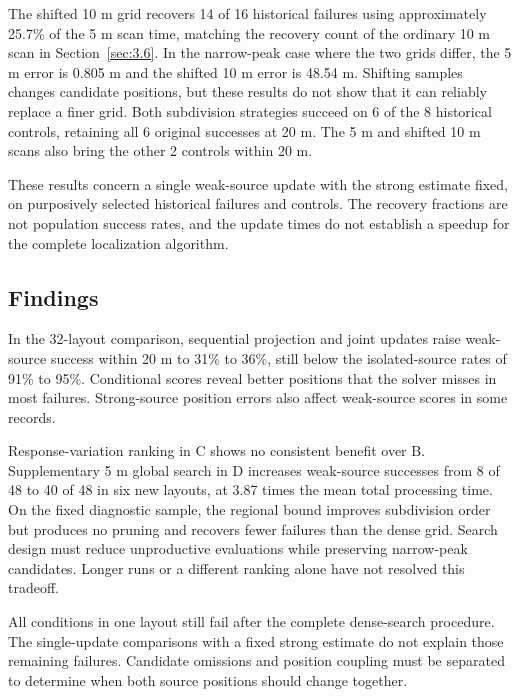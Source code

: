\documentclass[11pt,a4paper]{article}
\numberwithin{equation}{section}
\numberwithin{figure}{section}
\numberwithin{table}{section}
\begin{document}
The shifted 10 m grid recovers 14 of 16 historical failures using approximately 25.7\% of the 5 m scan time, matching the recovery count of the ordinary 10 m scan in Section~\ref{sec:3.6}. In the narrow-peak case where the two grids differ, the 5 m error is 0.805 m and the shifted 10 m error is 48.54 m. Shifting samples changes candidate positions, but these results do not show that it can reliably replace a finer grid. Both subdivision strategies succeed on 6 of the 8 historical controls, retaining all 6 original successes at 20 m. The 5 m and shifted 10 m scans also bring the other 2 controls within 20 m.

These results concern a single weak-source update with the strong estimate fixed, on purposively selected historical failures and controls. The recovery fractions are not population success rates, and the update times do not establish a speedup for the complete localization algorithm.

\subsection{Findings}\label{sec:3.11}

In the 32-layout comparison, sequential projection and joint updates raise weak-source success within 20 m to 31\% to 36\%, still below the isolated-source rates of 91\% to 95\%. Conditional scores reveal better positions that the solver misses in most failures. Strong-source position errors also affect weak-source scores in some records.

Response-variation ranking in C shows no consistent benefit over B. Supplementary 5 m global search in D increases weak-source successes from 8 of 48 to 40 of 48 in six new layouts, at 3.87 times the mean total processing time. On the fixed diagnostic sample, the regional bound improves subdivision order but produces no pruning and recovers fewer failures than the dense grid. Search design must reduce unproductive evaluations while preserving narrow-peak candidates. Longer runs or a different ranking alone have not resolved this tradeoff.

All conditions in one layout still fail after the complete dense-search procedure. The single-update comparisons with a fixed strong estimate do not explain those remaining failures. Candidate omissions and position coupling must be separated to determine when both source positions should change together.

\end{document}
